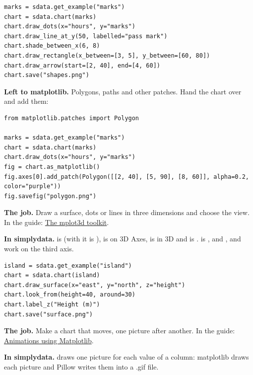 \begin{lstlisting}[style=py]
marks = sdata.get_example("marks")
chart = sdata.chart(marks)
chart.draw_dots(x="hours", y="marks")
chart.draw_line_at_y(50, labelled="pass mark")
chart.shade_between_x(6, 8)
chart.draw_rectangle(x_between=[3, 5], y_between=[60, 80])
chart.draw_arrow(start=[2, 40], end=[4, 60])
chart.save("shapes.png")
\end{lstlisting}

\textbf{Left to matplotlib.} Polygons, paths and other patches. Hand the chart over and add them:

\begin{lstlisting}[style=py]
from matplotlib.patches import Polygon

marks = sdata.get_example("marks")
chart = sdata.chart(marks)
chart.draw_dots(x="hours", y="marks")
fig = chart.as_matplotlib()
fig.axes[0].add_patch(Polygon([[2, 40], [5, 90], [8, 60]], alpha=0.2, color="purple"))
fig.savefig("polygon.png")
\end{lstlisting}


\textbf{The job.} Draw a surface, dots or lines in three dimensions and choose the view. In the guide:
\href{https://matplotlib.org/stable/users/explain/toolkits/mplot3d.html}{The mplot3d toolkit}.

\textbf{In simplydata.}  is  (with  it is
),  is  on 3D Axes, 
is  in 3D and  is .  is
, and ,  and  work on the third
axis.

\begin{lstlisting}[style=py]
island = sdata.get_example("island")
chart = sdata.chart(island)
chart.draw_surface(x="east", y="north", z="height")
chart.look_from(height=40, around=30)
chart.label_z("Height (m)")
chart.save("surface.png")
\end{lstlisting}


\textbf{The job.} Make a chart that moves, one picture after another. In the guide:
\href{https://matplotlib.org/stable/users/explain/animations/animations.html}{Animations using
Matplotlib}.

\textbf{In simplydata.}  draws one picture for each value of a column:
matplotlib draws each picture and Pillow writes them into a .gif file.

